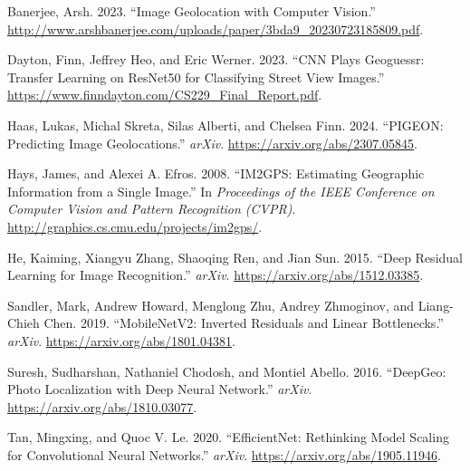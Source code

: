 \label{refs}
\begin{CSLReferences}{1}{0}
Banerjee, Arsh. 2023. {``Image Geolocation with Computer Vision.''}
\url{http://www.arshbanerjee.com/uploads/paper/3bda9_20230723185809.pdf}.

Dayton, Finn, Jeffrey Heo, and Eric Werner. 2023. {``CNN Plays
Geoguessr: Transfer Learning on ResNet50 for Classifying Street View
Images.''} \url{https://www.finndayton.com/CS229_Final_Report.pdf}.

Haas, Lukas, Michal Skreta, Silas Alberti, and Chelsea Finn. 2024.
{``PIGEON: Predicting Image Geolocations.''} \emph{arXiv}.
\url{https://arxiv.org/abs/2307.05845}.

Hays, James, and Alexei A. Efros. 2008. {``IM2GPS: Estimating Geographic
Information from a Single Image.''} In \emph{Proceedings of the IEEE
Conference on Computer Vision and Pattern Recognition (CVPR)}.
\url{http://graphics.cs.cmu.edu/projects/im2gps/}.

He, Kaiming, Xiangyu Zhang, Shaoqing Ren, and Jian Sun. 2015. {``Deep
Residual Learning for Image Recognition.''} \emph{arXiv}.
\url{https://arxiv.org/abs/1512.03385}.

Sandler, Mark, Andrew Howard, Menglong Zhu, Andrey Zhmoginov, and
Liang-Chieh Chen. 2019. {``MobileNetV2: Inverted Residuals and Linear
Bottlenecks.''} \emph{arXiv}. \url{https://arxiv.org/abs/1801.04381}.

Suresh, Sudharshan, Nathaniel Chodosh, and Montiel Abello. 2016.
{``DeepGeo: Photo Localization with Deep Neural Network.''}
\emph{arXiv}. \url{https://arxiv.org/abs/1810.03077}.

Tan, Mingxing, and Quoc V. Le. 2020. {``EfficientNet: Rethinking Model
Scaling for Convolutional Neural Networks.''} \emph{arXiv}.
\url{https://arxiv.org/abs/1905.11946}.

\end{CSLReferences}
